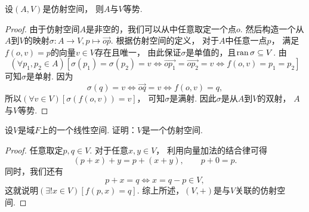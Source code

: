 \begin{proposition}\label{theorem:仿射空间.仿射空间与线性空间等势}
设\((A,V)\)是仿射空间，
则\(A\)与\(V\)等势.
\begin{proof}
由于仿射空间\(A\)是非空的，我们可以从中任意取定一个点\(o\).
然后构造一个从\(A\)到\(V\)的映射\(\sigma\colon A \to V, p \mapsto \vec{op}\).
根据仿射空间的定义，
对于\(A\)中任意一点\(p\)，
满足\(f(o,v) = p\)的向量\(v \in V\)存在且唯一，
由此保证\(\sigma\)是单值的，且\(\operatorname{ran}\sigma \subseteq V\).
由\begin{equation*}
	(\forall p_1,p_2 \in A)
	[
		\sigma(p_1) = \sigma(p_2) = v
		\iff
		\vec{op_1} = \vec{op_2} = v
		\iff
		f(o,v) = p_1 = p_2
	]
\end{equation*}
可知\(\sigma\)是单射.
因为\begin{equation*}
	\sigma(q) = v
	\iff  %
	\vec{oq} = v
	\iff  %
	f(o,v) = q,
\end{equation*}
所以\(
	(\forall v \in V)
	[
		\sigma(f(o,v)) = v
	]
\)，
可知\(\sigma\)是满射.
因此\(\sigma\)是从\(A\)到\(V\)的双射，
\(A\)与\(V\)等势.
\end{proof}
\end{proposition}

\begin{example}
设\(V\)是域\(F\)上的一个线性空间.
证明：\(V\)是一个仿射空间.
\begin{proof}
任意取定\(p,q \in V\).
对于任意\(x,y \in V\)，
利用向量加法的结合律可得\begin{equation*}
	(p + x) + y
	= p + (x + y),
	\qquad
	p + 0
	= p.
\end{equation*}
同时，我们还有\begin{equation*}
	p + x = q
	\iff
	x = q - p \in V,
\end{equation*}
这就说明\(
	(\exists! x \in V)
	[
		f(p,x) = q
	]
\).
综上所述，\((V,+)\)是与\(V\)关联的仿射空间.
\end{proof}
\end{example}

